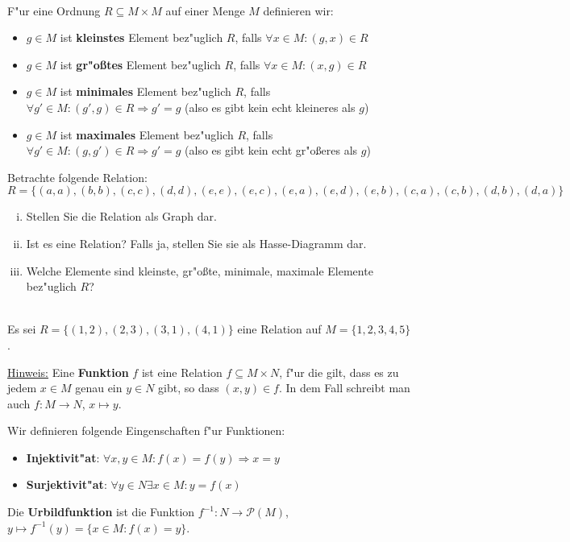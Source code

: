 \\
F"ur eine Ordnung $R\subseteq M\times M$ auf einer Menge $M$ definieren wir:
\begin{itemize}
    \item $g\in M$ ist \textbf{kleinstes} Element bez"uglich $R$, falls $\forall x\in M:(g,x)\in R$
    \item $g\in M$ ist \textbf{gr"o{\ss}tes} Element bez"uglich $R$, falls $\forall x\in M:(x,g)\in R$
    \item $g\in M$ ist \textbf{minimales} Element bez"uglich $R$, falls $\forall g'\in M: (g',g)\in R\Rightarrow g'=g$ (also es gibt kein echt kleineres als $g$)
    \item $g\in M$ ist \textbf{maximales} Element bez"uglich $R$, falls $\forall g'\in M: (g,g')\in R\Rightarrow g'=g$ (also es gibt kein echt gr"o{\ss}eres als $g$)
\end{itemize}
Betrachte folgende Relation: $R=\{(a,a),(b,b),(c,c),(d,d),(e,e),(e,c),(e,a),(e,d),(e,b),(c,a),(c,b),(d,b),(d,a)\}$
\begin{enumerate}[(i)]
    \item Stellen Sie die Relation als Graph dar.
    \item Ist es eine Relation? Falls ja, stellen Sie sie als Hasse-Diagramm dar.
    \item Welche Elemente sind kleinste, gr"o{\ss}te, minimale, maximale Elemente bez"uglich $R$?
\end{enumerate}

\\
Es sei $R=\{(1,2),(2,3),(3,1),(4,1)\}$ eine Relation auf $M=\{1,2,3,4,5\}$. 

\underline{Hinweis:} Eine \textbf{Funktion} $f$ ist eine Relation $f\subseteq M\times N$, f"ur die gilt, dass es zu jedem $x\in M$ genau ein $y\in N$ gibt, so dass $(x,y)\in f$. In dem Fall schreibt man auch $f:M\to N$, $x\mapsto y$.

Wir definieren folgende Eingenschaften f"ur Funktionen:
\begin{itemize}
    \item \textbf{Injektivit"at}: $\forall x,y\in M:f(x)=f(y)\Rightarrow x=y$
    \item \textbf{Surjektivit"at}: $\forall y\in N\exists x\in M:y=f(x)$
\end{itemize}

Die \textbf{Urbildfunktion} ist die Funktion $f^{-1}:N\to\mathscr{P}(M)$, $y\mapsto f^{-1}(y)=\{x\in M:f(x)=y\}$.

